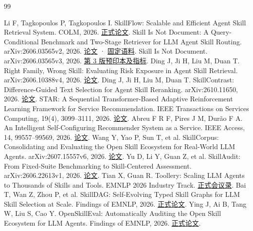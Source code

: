 \documentclass[final,5p,twocolumn,10pt]{elsarticle}
\begin{document}
\begingroup
\small
\setlength{\bibsep}{2pt plus 1pt}
\begin{thebibliography}{99}
\raggedright
{} Li F, Tagkopoulos P, Tagkopoulos I. SkillFlow: Scalable and Efficient Agent Skill Retrieval System. COLM, 2026. \href{https://proceedings.colm.cc/paper_files/paper/2026/file/425ee25d6c22ef98b67328273b8f95d5-Paper-Conference.pdf}{正式论文}.
 Skill Is Not Document: A Query-Conditional Benchmark and Two-Stage Retriever for LLM Agent Skill Routing. arXiv:2606.03565v2, 2026. \href{https://arxiv.org/html/2606.03565v2}{论文} · \href{https://github.com/Tencent/R3-Skill/tree/57d9285969cc293832c71ecbe42a75ac416bef93/data}{固定语料}.
 Skill Is Not Document. arXiv:2606.03565v3, 2026. \href{https://arxiv.org/html/2606.03565v3}{第 3 版预印本及指标}.
 Ding J, Ji H, Liu M, Duan T. Right Family, Wrong Skill: Evaluating Risk Exposure in Agent Skill Retrieval. arXiv:2606.10388v4, 2026. \href{https://arxiv.org/abs/2606.10388v4}{论文}.
 Ding J, Ji H, Liu M, Duan T. SkillContrast: Difference-Guided Text Selection for Agent Skill Reranking. arXiv:2610.11650, 2026. \href{https://arxiv.org/abs/2610.11650}{论文}.
 STAR: A Sequential Transformer-Based Adaptive Reinforcement Learning Framework for Service Recommendation. IEEE Transactions on Services Computing, 19(4), 3099--3111, 2026. \href{https://doi.org/10.1109/TSC.2026.3704136}{论文}.
 Abreu F R F, Pires J M, Durão F A. An Intelligent Self-Configuring Recommender System as a Service. IEEE Access, 14, 99557--99569, 2026. \href{https://doi.org/10.1109/ACCESS.2026.3707991}{论文}.
 Wang Y, Yao P, Sun T, et al. SkillCorpus: Consolidating and Evaluating the Open Skill Ecosystem for Real-World LLM Agents. arXiv:2607.15557v6, 2026. \href{https://arxiv.org/abs/2607.15557v6}{论文}.
 Yu D, Li Y, Guan Z, et al. SkillAudit: From Fixed-Suite Benchmarking to Skill-Centered Assessment. arXiv:2606.22613v1, 2026. \href{https://arxiv.org/abs/2606.22613v1}{论文}.
 Tian X, Guan R. Toollery: Scaling LLM Agents to Thousands of Skills and Tools. EMNLP 2026 Industry Track. \href{https://aclanthology.org/volumes/2026.emnlp-industry/}{正式会议录}.
 Bai T, Wan Z, Zhou P, et al. SkillDAG: Self-Evolving Typed Skill Graphs for LLM Skill Selection at Scale. Findings of EMNLP, 2026. \href{https://aclanthology.org/2026.findings-emnlp.1022/}{正式论文}.
 Ying J, Ai B, Tang W, Liu S, Cao Y. OpenSkillEval: Automatically Auditing the Open Skill Ecosystem for LLM Agents. Findings of EMNLP, 2026. \href{https://aclanthology.org/2026.findings-emnlp.1554/}{正式论文}.

\end{thebibliography}
\end{document}
